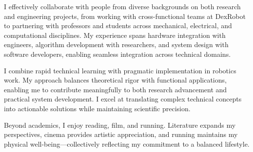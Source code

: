 
\begin{cvparagraph}
I effectively collaborate with people from diverse backgrounds on both research and engineering projects, from working with cross-functional teams at DexRobot to partnering with professors and students across mechanical, electrical, and computational disciplines. My experience spans hardware integration with engineers, algorithm development with researchers, and system design with software developers, enabling seamless integration across technical domains.
\end{cvparagraph}

\begin{cvparagraph}
I combine rapid technical learning with pragmatic implementation in robotics work. My approach balances theoretical rigor with functional applications, enabling me to contribute meaningfully to both research advancement and practical system development. I excel at translating complex technical concepts into actionable solutions while maintaining scientific precision.
\end{cvparagraph}

\begin{cvparagraph}
Beyond academics, I enjoy reading, film, and running. Literature expands my perspectives, cinema provides artistic appreciation, and running maintains my physical well-being—collectively reflecting my commitment to a balanced lifestyle.
\end{cvparagraph}